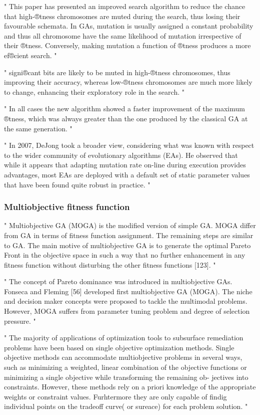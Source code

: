 "
This paper has presented an improved search algorithm to reduce the chance that high-®tness chromosomes are muted during the search, thus losing their favourable schemata. In GAs, mutation is usually assigned a constant probability and thus all chromosome have the same likelihood of mutation irrespective of their ®tness. Conversely, making mutation a function of ®tness produces a more ef®cient search.
"\cite{marsili_libelli_adaptive_2000}

"
signi®cant bits are likely to be muted in high-®tness chromosomes, thus improving their accuracy, whereas low-®tness chromosomes are much more likely to change, enhancing their exploratory role in the search.
"\cite{marsili_libelli_adaptive_2000}

"
In all cases the new algorithm showed a faster improvement of the maximum ®tness, which was always greater than the one produced by the classical GA at the same generation.
"\cite{marsili_libelli_adaptive_2000}


"
In 2007, DeJong took a broader view, considering what was known with respect to the wider community of evolutionary algorithms (EAs). He observed that while it appears that adapting mutation rate on-line during execution provides advantages, most EAs are deployed with a default set of static parameter values that have been found quite robust in practice.
"\cite{mills_determining_2015}
\fi


\iffalse
\subsubsection{Multiobjective fitness function}

"
Multiobjective GA (MOGA) is the modified version of simple GA. MOGA differ from GA in terms of fitness function assignment. The remaining steps are similar to GA. The main motive of multiobjective GA is to generate the optimal Pareto Front in the objective space in such a way that no further enhancement in any fitness function without disturbing the other fitness functions [123].
"\cite{katoch_review_2021}


"
The concept of Pareto dominance was introduced in multiobjective GAs. Fonseca and Fleming [56] developed first multiobjective GA (MOGA). The niche and decision maker concepts were proposed to tackle the multimodal problems. However, MOGA suffers from parameter tuning problem and degree of selection pressure.
"\cite{katoch_review_2021}

"
The majority of applications of optimization tools to subsurface remediation problems have been based on single objective optimization methods. Single objective methods can accommodate multiobjective problems in several ways, such as minimizing a weighted, linear combination of the objective functions or minimizing a single objective while transforming the remaining ob- jectives into constraints. However, these methods rely on a priori knowledge of the appropriate weights or constraint values. Furhtermore they are only capable of findig individual points on the tradeoff curve( or sureace) for each problem solution.
"\cite{erickson_multi-objective_2002}

